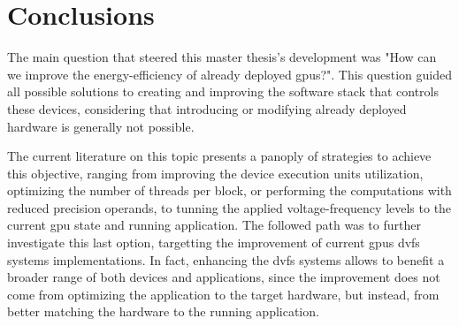 
\chapter{Conclusions}
\label{chapter:conclusions}

The main question that steered this master thesis's development was "How can we improve the energy-efficiency of already deployed \acrshort{gpu}s?". This question guided all possible solutions to creating and improving the software stack that controls these devices, considering that introducing or modifying already deployed hardware is generally not possible.

The current literature on this topic presents a panoply of strategies to achieve this objective, ranging from improving the device execution units utilization, optimizing the number of threads per block, or performing the computations with reduced precision operands, to tunning the applied voltage-frequency levels to the current \acrshort{gpu} state and running application. The followed path was to further investigate this last option, targetting the improvement of current \acrshort{gpu}s \acrshort{dvfs} systems implementations. In fact, enhancing the \acrshort{dvfs} systems allows to benefit a broader range of both devices and applications, since the improvement does not come from optimizing the application to the target hardware, but instead, from better matching the hardware to the running application.


